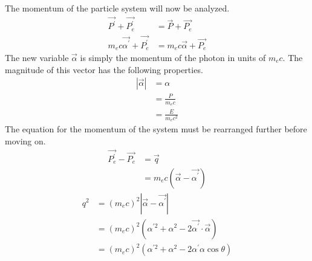 The momentum of the particle system will now be analyzed. 
\begin{align}
  \vec{P^{'}} + \vec{P_e^{'}} & = \vec{P} + \vec{P_e} \nonumber \\
  m_ec\vec{\alpha^{'}} + \vec{P_e^{'}} & = m_ec\vec{\alpha} + \vec{P_e} \nonumber
\end{align}
The new variable $\vec{\alpha}$ is simply the momentum of the photon in 
units of $m_ec$. The magnitude of this vector has the following properties.
\begin{align}
  \left|\vec{\alpha}\right| & = \alpha \nonumber \\
  & = \frac{P}{m_ec} \\ 
  & = \frac{E}{m_ec^2} 
\end{align}
The equation for the momentum of the system must be rearranged further before
moving on.
\begin{align}
  \vec{P_e^{'}} - \vec{P_e} & = \vec{q} \nonumber \\
  & = m_ec\left(\vec{\alpha} - \vec{\alpha^{'}}\right) \nonumber
\end{align}
\begin{align}
  q^2 & = (m_ec)^2\left|\vec{\alpha} - \vec{\alpha^{'}}\right| \nonumber \\
  & = (m_ec)^2\left(\alpha^{'2} + \alpha^2 - 
  2\vec{\alpha^{'}}\cdot\vec{\alpha}\right) \nonumber \\
  & = (m_ec)^2\left(\alpha^{'2} + \alpha^2 - 2\alpha^{'}\alpha\cos{\theta}\right)
\end{align}

